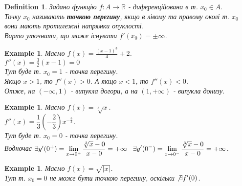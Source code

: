 \documentclass[a4paper, 14pt]{article}
\def\huge{\displaystyle}
\theoremstyle{theoremdd}
\theoremstyle{theoremdd}
\newtheorem{definition}[theorem]{Definition}
\theoremstyle{theoremdd}
\theoremstyle{theoremdd}
\newtheorem{example}[theorem]{Example}
\theoremstyle{theoremdd}
\theoremstyle{theoremdd}
\theoremstyle{theoremdd}
\theoremstyle{theoremdd}
\begin{document}
\begin{definition}
Задано функцію $f: A \to \mathbb{R}$ - диференційована в т. $x_0 \in A$.\\
Точку $x_0$ називають \textbf{точкою перегину}, якщо в лівому та правому околі т. $x_0$ вони мають протилежні напрямки опуклості.\\
Варто уточнити, що може існувати $f'(x_0) = \pm \infty$.
\end{definition}

\begin{example}
Маємо $f(x) = \huge \frac{(x-1)^3}{4} + 2$.\\
$f''(x) = \huge \frac{3}{2}(x-1) = 0$\\
Тут буде т. $x_0 = 1$ - точка перегину.\\
Якщо $x > 1$, то $f''(x) > 0$. А якщо $x < 1$, то $f''(x) < 0$.\\
Отже, на $(-\infty,1)$ - випукла догори, а на $(1,+\infty)$ - випукла донизу.
\end{example}

\begin{example}
Маємо $f(x) = \sqrt[3]{x}$.\\
$f''(x) = \dfrac{1}{3} \left( -\dfrac{2}{3} \right) x^{-\frac{5}{3}}$.\\
Тут буде т. $x_0 = 0$ - точка перегину.\\
Водночас $\exists y'(0^+) = \huge \lim_{x \to 0^+} \dfrac{\sqrt[3]{x} - 0}{x - 0} = +\infty \hspace{0.3cm} \exists y'(0^-) = \huge \lim_{x \to 0^-} \dfrac{\sqrt[3]{x} - 0}{x - 0} = +\infty$.
\begin{figure}[H]
\centering
{}
\end{figure}
\end{example}

\begin{example}
Маємо $f(x) = \sqrt{|x|}$.\\
Тут т. $x_0 = 0$ не може бути точкою перегину, оскільки $\not \exists f'(0)$.
\end{example}
\end{document}
